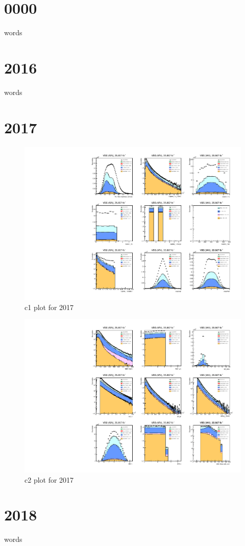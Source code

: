\documentclass{article}
\begin{document}
	\graphicspath{ {../plots/} }
	\section*{0000}
		words
	\section*{2016}
		words
	\section*{2017}
		\begin{figure}[H]
			\centering
			\includegraphics{2017/c1_2017_test.pdf}
			\caption{c1 plot for 2017}
		\end{figure}
		\begin{figure}
			\centering
			\includegraphics{2017/c2_2017_test.pdf}
			\caption{c2 plot for 2017}
		\end{figure}
	\section*{2018}
		words
\end{document}
